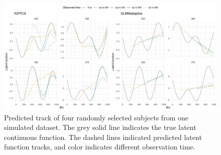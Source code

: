 \documentclass[
  11pt,
]{article}
\begin{document}
\begin{figure}
\centering
\includegraphics{Manuscript_files/figure-latex/Figure-1.pdf}
\caption{Predicted track of four randomly selected subjects from one
simulated dataset. The grey solid line indicates the true latent
continuous function. The dashed lines indicated predicted latent
function tracks, and color indicates different observation time.}
\end{figure}
\end{document}
